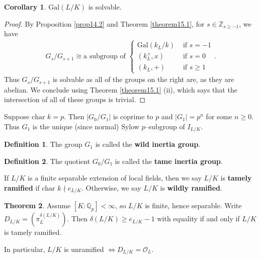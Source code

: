 \documentclass{article}
\theoremstyle{definition}
\newtheorem{theorem}{Theorem}[section]
\newtheorem{cor}[theorem]{Corollary}
\newtheorem{defn}{Definition}[section]
\begin{document}
\begin{cor}
    $\text{Gal}(L/K)$ is solvable.
\end{cor}
\begin{proof}
    By Proposition \ref{prop14.2} and Theorem \ref{theorem15.1}, for $s \in \mathbb{Z}_{s \ge -1}$, we have 
    \begin{align*}
        G_s/G_{s+1} \cong \text{a subgroup of } \begin{cases}
            \text{Gal}(k_L/k) &\text{ if }s = -1\\
            (k_L^\times,x) & \text{ if }s=0\\
            (k_L, +) &\text{ if }s\ge 1
        \end{cases}.
    \end{align*}
    Thus $G_s/G_{s+1}$ is solvable as all of the groups on the right are, as they are abelian. We conclude using Theorem \ref{theorem15.1} (ii), which says that the intersection of all of these groups is trivial.
\end{proof}
Suppose $\text{char }k = p$. Then $|G_0/G_1|$ is coprime to $p$ and $|G_1| = p^n$ for some $n\ge 0$. Thus $G_1$ is the unique (since normal) Sylow $p$--subgroup of $I_{L/K}$.
\begin{defn}
    The group $G_1$ is called the \textbf{wild inertia group}.
\end{defn}
\begin{defn}
    The quotient $G_0/G_1$ is called the \textbf{tame inertia group}.
\end{defn}
If $L/K$ is a finite separable extension of local fields, then we say $L/K$ is \textbf{tamely ramified} if $\text{char }k \nmid e_{L/K}$. Otherwise, we say $L/K$ is \textbf{wildly ramified}.
\begin{theorem}\label{theorem15.3}
    Assume $[K: \mathbb{Q}_p]<\infty$, so $L/K$ is finite, hence separable. Write $D_{L/K} = (\pi_L^{\delta(L/K)})$. Then $\delta(L/K)\ge e_{L/K}-1$ with equality if and only if $L/K$ is tamely ramified.
    \vspace{1mm}
     
    In particular, $L/K$ is unramified $\iff D_{L/K} = \mathcal{O}_L$. 
\end{theorem}
\end{document}
